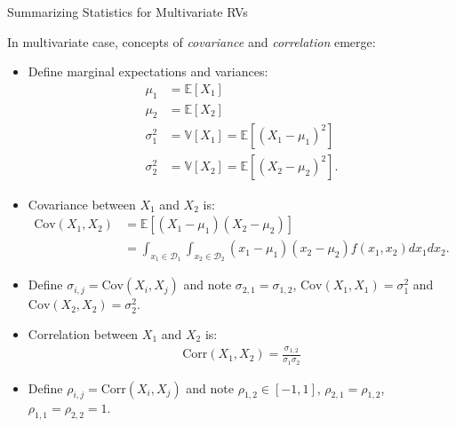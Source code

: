 \documentclass[handout,9pt]{beamer}
\begin{document}
%
\begin{frame}{Summarizing Statistics for Multivariate RVs}

In multivariate case, concepts of {\em covariance} and {\em correlation} emerge:
\begin{itemize}
\setlength{\itemsep}{5pt}
\item Define marginal expectations and variances:
\begin{align*}
\mu_{1}&=\mathbb{E}[X_1]\\
\mu_{2}&=\mathbb{E}[X_2]\\
\sigma_1^2&=\mathbb{V}[X_1]=\mathbb{E}[(X_1-\mu_1)^2]\\
\sigma_2^2&=\mathbb{V}[X_2]=\mathbb{E}[(X_2-\mu_2)^2].
\end{align*}
\item Covariance between $X_1$ and $X_2$ is:
 \begin{align*}
\textrm{Cov}(X_1,X_2)&=\mathbb{E}[(X_1-\mu_1)(X_2-\mu_2)]\\
&=\int_{x_1\in \mathcal{D}_1}\int_{x_2\in\mathcal{D}_2}(x_1-\mu_1)(x_2-\mu_2)f(x_1,x_2)dx_1dx_2.
\end{align*}
\item Define $\sigma_{i,j}=\textrm{Cov}(X_i,X_j)$ and note $\sigma_{2,1}=\sigma_{1,2}$, $\textrm{Cov}(X_1,X_1)=\sigma_1^2$ and $\textrm{Cov}(X_2,X_2)=\sigma_2^2$. 
\item Correlation between $X_1$ and $X_2$ is:
 \begin{align*}
\textrm{Corr}(X_1,X_2)=\frac{\sigma_{1,2}}{\sigma_1\sigma_2}
\end{align*}
\item  Define $\rho_{i,j}=\textrm{Corr}(X_i,X_j)$ and note $\rho_{1,2}\in [-1,1]$, $\rho_{2,1}=\rho_{1,2}$, $\rho_{1,1}=\rho_{2,2}=1$. 
\end{itemize}

\end{frame}
\end{document}

